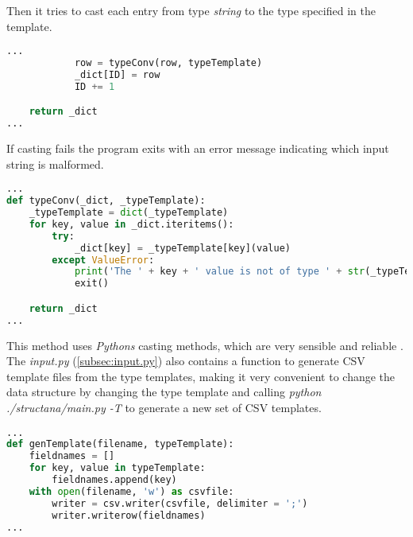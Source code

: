 Then it tries to cast each entry from type \textit{string} to the type specified in the template.

\begin{inconsolata}
\begin{minipage}{\linewidth}
\begin{lstlisting}[language=python]
...
            row = typeConv(row, typeTemplate)
            _dict[ID] = row
            ID += 1

    return _dict
...
\end{lstlisting}
\end{minipage}
\end{inconsolata}

If casting fails the program exits with an error message indicating which input string is malformed.

\begin{inconsolata}
\begin{minipage}{\linewidth}
\begin{lstlisting}[language=python]
...
def typeConv(_dict, _typeTemplate):
    _typeTemplate = dict(_typeTemplate)
    for key, value in _dict.iteritems():
        try:
            _dict[key] = _typeTemplate[key](value)
        except ValueError:
            print('The ' + key + ' value is not of type ' + str(_typeTemplate[key]) + '.')
            exit()

    return _dict
...
\end{lstlisting}
\end{minipage}
\end{inconsolata}

This method uses \textit{Pythons} casting methods, which are very sensible and reliable \cite[2.4.1-2.4.6]{pythonTypes}.
The \textit{input.py} (\cref{subsec:input.py}) also contains a function to generate CSV template files from the type templates, making it very convenient to change the data structure by changing the type template and calling \textit{python ./structana/main.py -T} to generate a new set of CSV templates.

\begin{inconsolata}
\begin{minipage}{\linewidth}
\begin{lstlisting}[language=python]
...
def genTemplate(filename, typeTemplate):
    fieldnames = []
    for key, value in typeTemplate:
        fieldnames.append(key)
    with open(filename, 'w') as csvfile:
        writer = csv.writer(csvfile, delimiter = ';')
        writer.writerow(fieldnames)
...
\end{lstlisting}
\end{minipage}
\end{inconsolata}

